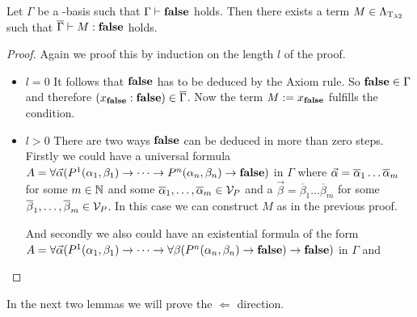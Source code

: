 \begin{lemma}\label{l1}
Let $\Gamma$ be a \SysP-basis such that $\Gamma\vdash\textbf{false}$ holds. Then there exists a term $M\in\Lambda_{\text{T}_{\lambda2}}$ such that $\overline{\Gamma}\vdash M:\textbf{false}$ holds.
\end{lemma}
\begin{proof}
Again we proof this by induction on the length $l$ of the proof.

\begin{itemize}
	\item[] \underline{$l=0$} It follows that $\textbf{false}$ has to be deduced by the Axiom rule. So $\textbf{false}\in\Gamma$ and therefore $(x_{\textbf{false}}:\textbf{false})\in\overline{\Gamma}$. Now the term $M:=x_{\textbf{false}}$ fulfills the condition.
	
	\item[] \underline{$l>0$} There are two ways $\textbf{false}$ can be deduced in more than zero steps. 
	Firstly we could have a universal formula $A=\forall\predVec(P^1(\predFst[1],\predSnd[1])\to\dots\to P^n(\predFst[n],\predSnd[n])\to \false)$ in $\Gamma$ where $\predVec=\predVec[1]\dots\predVec[m]$ for some $m\in\mathbb{N}$ and some $\predVec[1],\dots,\predVec[m]\in\VarP$ and a $\vec{\beta}=\overline{\beta}_1\dots\overline{\beta}_m$ for some $\overline{\beta}_1,\dots,\overline{\beta}_m\in\mathcal{V}_P$. In this case we can construct $M$ as in the previous proof.%


	And secondly we also could have an existential formula of the form $A=\forall\predVec(P^1(\predFst[1],\predSnd[1])\to\dots\to \forall\beta(P^n(\predFst[n],\predSnd[n])\to\false)\to \false)$ in $\Gamma$ and 
\end{itemize}
\end{proof}

In the next two lemmas we will prove the $\Leftarrow$ direction.

